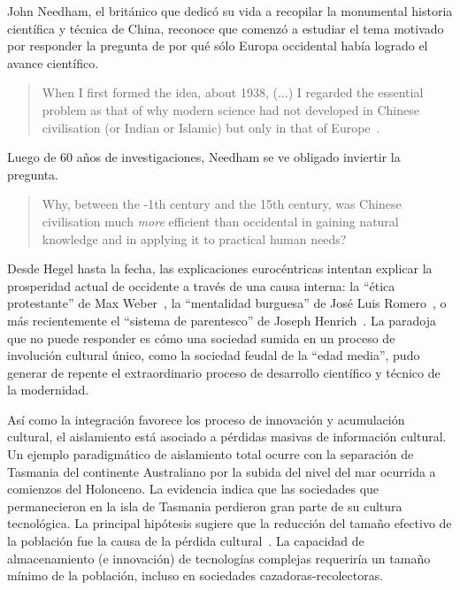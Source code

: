 \documentclass[a4paper,10pt]{book}
\theoremstyle{definition}
\begin{document}
John Needham, el brit\'anico que dedic\'o su vida a recopilar la monumental historia cient\'ifica y t\'ecnica de China, reconoce que comenz\'o a estudiar el tema motivado por responder la pregunta de por qu\'e s\'olo Europa occidental hab\'ia logrado el avance cient\'ifico.
%
\begin{quotation}
When I first formed the idea, about 1938, (...) I regarded the essential problem as that of why modern science had not developed in Chinese civilisation (or Indian or Islamic) but only in that of Europe~\cite{needham2004-generalConclusionsAndReflections}.%
\end{quotation}
Luego de 60 a\~nos de investigaciones, Needham se ve obligado inviertir la pregunta.
\begin{quotation}
Why, between the -1th century and the 15th century, was Chinese civilisation much \emph{more} efficient than occidental in gaining natural knowledge and in applying it to practical human needs?~\cite{needham2004-generalConclusionsAndReflections}
\end{quotation}


Desde Hegel hasta la fecha, las explicaciones euroc\'entricas intentan explicar la prosperidad actual de occidente a trav\'es de una causa interna: la ``\'etica protestante'' de Max Weber~\cite{weber1905-eticaProtestante}, la ``mentalidad burguesa'' de Jos\'e Luis Romero~\cite{romero1967-revolucionBurguesa}, o m\'as recientemente el ``sistema de parentesco'' de Joseph Henrich~\cite{henrich2020-weirdest}.
%
La paradoja que no puede responder es c\'omo una sociedad sumida en un proceso de involuci\'on cultural \'unico, como la sociedad feudal de la ``edad media'', pudo generar de repente el extraordinario proceso de desarrollo cient\'ifico y t\'ecnico de la modernidad.


As\'i como la integraci\'on favorece los proceso de innovaci\'on y acumulaci\'on cultural, el aislamiento está asociado a p\'erdidas masivas de informaci\'on cultural.
%
Un ejemplo paradigm\'atico de aislamiento total ocurre con la separaci\'on de Tasmania del continente Australiano por la subida del nivel del mar ocurrida a comienzos del Holonceno.
%
La evidencia indica que las sociedades que permanecieron en la isla de Tasmania perdieron gran parte de su cultura tecnol\'ogica.
%
La principal hip\'otesis sugiere que la reducci\'on del tama\~no efectivo de la poblaci\'on fue la causa de la p\'erdida cultural~\cite{Henrich2004}.
%
La capacidad de almacenamiento (e innovaci\'on) de tecnolog\'ias complejas requerir\'ia un tama\~no m\'inimo de la poblaci\'on, incluso en sociedades cazadoras-recolectoras.
\end{document}
